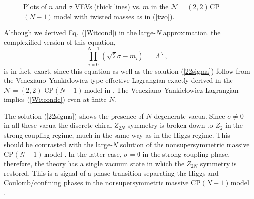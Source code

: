 \documentclass[epsfig,12pt]{article}
\def\beq{\begin{equation}}
\def\eeq{\end{equation}}
\newcommand{\ntt}{${\mathcal N}=(2,2)\,$}
\newcommand{\cpn}{CP$(N-1)\,$}
\def\beq{\begin{equation}}
\def\eeq{\end{equation}}
\newcommand{\ntwot}{${\mathcal N}= \left(2,2\right) $ }
\begin{document}
\begin{figure}
\centerline{}
\caption{\small Plots of $n$ and $\sigma$ VEVs (thick lines) vs. $m$
in the \ntt \cpn model with twisted masses as in (\ref{two}). }
\label{fig22nsigma}
\end{figure}

Although we derived  Eq.~(\ref{Witcond}) in the large-$N$ approximation, the 
complexified version of this equation,
\beq
\prod_{i=0}^{N-1}\left(\sqrt{2}\sigma-m_i\right) \,=\,\Lambda^N \,,
\label{Witcondc}
\eeq
is in fact,
exact, since  this equation as well as the solution (\ref{22sigma}) follow from the
Veneziano--Yankielowicz-type  effective Lagrangian exactly derived in the \ntwot \cpn model  
in  \cite{AdDVecSal,ChVa,W93,HaHo,Dor}. The Veneziano--Yankielowicz  Lagrangian implies (\ref{Witcondc}) 
even at finite $N$.

The solution (\ref{22sigma}) shows the presence of $N$ degenerate vacua. Since $\sigma \neq 0$  in all these vacua
the discrete chiral $Z_{2N}$ symmetry is broken down to $Z_2$ in the strong-coupling regime, much in the same way as
in the Higgs regime. This should be contrasted with the large-$N$ solution of the nonsupersymmetric
massive \cpn model \cite{GSYphtr}. In the latter case, $\sigma=0$ in the strong coupling phase, 
therefore, the theory
has   a single vacuum state in which the $Z_{2N}$ symmetry is restored. This is a signal of a phase transition
separating the Higgs and Coulomb/confining phases in the nonsupersymmetric massive \cpn model \cite{GSYphtr}.
\end{document}
